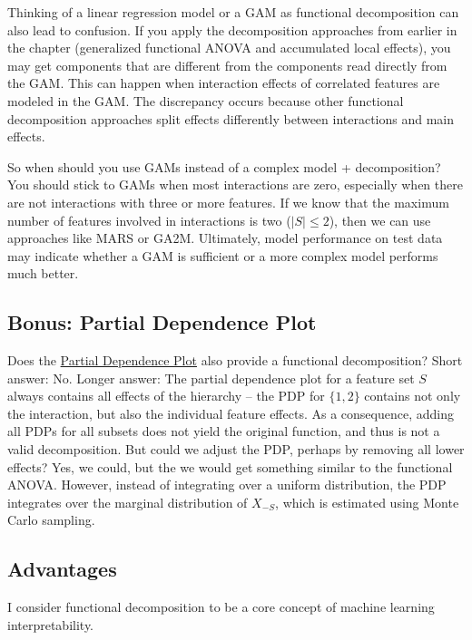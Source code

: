 \documentclass[
  12pt,
]{krantz}
\begin{document}
Thinking of a linear regression model or a GAM as functional decomposition can also lead to confusion.
If you apply the decomposition approaches from earlier in the chapter (generalized functional ANOVA and accumulated local effects), you may get components that are different from the components read directly from the GAM.
This can happen when interaction effects of correlated features are modeled in the GAM.
The discrepancy occurs because other functional decomposition approaches split effects differently between interactions and main effects.

So when should you use GAMs instead of a complex model + decomposition?
You should stick to GAMs when most interactions are zero, especially when there are not interactions with three or more features.
If we know that the maximum number of features involved in interactions is two (\(|S|\leq{}2\)), then we can use approaches like MARS or GA2M.
Ultimately, model performance on test data may indicate whether a GAM is sufficient or a more complex model performs much better.

\hypertarget{bonus-partial-dependence-plot}{%
\subsection{Bonus: Partial Dependence Plot}\label{bonus-partial-dependence-plot}}

Does the \protect\hyperlink{pdp}{Partial Dependence Plot} also provide a functional decomposition?
Short answer: No.
Longer answer:
The partial dependence plot for a feature set \(S\) always contains all effects of the hierarchy -- the PDP for \(\{1,2\}\) contains not only the interaction, but also the individual feature effects.
As a consequence, adding all PDPs for all subsets does not yield the original function, and thus is not a valid decomposition.
But could we adjust the PDP, perhaps by removing all lower effects?
Yes, we could, but the we would get something similar to the functional ANOVA.
However, instead of integrating over a uniform distribution, the PDP integrates over the marginal distribution of \(X_{-S}\), which is estimated using Monte Carlo sampling.

\hypertarget{advantages-8}{%
\subsection{Advantages}\label{advantages-8}}

I consider functional decomposition to be a core concept of machine learning interpretability.
\end{document}
